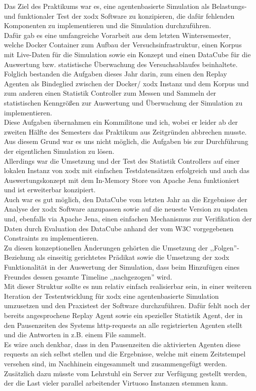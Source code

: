 \documentclass{article}
\begin{document}
Das Ziel des Praktikums war es, eine agentenbasierte Simulation als Belastungs- und funktionaler Test der xodx Software zu konzipieren, die dafür fehlenden Komponenten zu implementieren und die Simulation durchzuführen.\\
Dafür gab es eine umfangreiche Vorarbeit aus dem letzten Wintersemester, welche Docker Container zum Aufbau der Versuchsinfrastruktur, einen Korpus mit Live-Daten für die Simulation sowie ein Konzept und einen DataCube für die Auswertung bzw. statistische Überwachung des Versuchsablaufes beinhaltete.\\
Folglich bestanden die Aufgaben dieses Jahr darin, zum einen den Replay Agenten als Bindeglied zwischen der Docker/ xodx Instanz und dem Korpus und zum anderen einen Statistik Controller zum Messen und Sammeln der statistischen Kenngrößen zur Auswertung und Überwachung der Simulation zu implementieren.\\
Diese Aufgaben übernahmen ein Kommilitone und ich, wobei er leider ab der zweiten Hälfte des Semesters das Praktikum aus Zeitgründen abbrechen musste. Aus diesem Grund war es uns nicht möglich, die Aufgaben bis zur Durchführung der eigentlichen Simulation zu lösen.\\
Allerdings war die Umsetzung und der Test des Statistik Controllers auf einer lokalen Instanz von xodx mit einfachen Testdatensätzen erfolgreich und auch das Auswertungskonzept mit dem In-Memory Store von Apache Jena funktioniert und ist erweiterbar konzipiert.\\
Auch war es gut möglich, den DataCube vom letzten Jahr an die Ergebnisse der Analyse der xodx Software anzupassen sowie auf die neueste Version zu updaten und, ebenfalls via Apache Jena, einen einfachen Mechanismus zur Verifikation der Daten durch Evaluation des DataCube anhand der vom W3C vorgegebenen Constraints zu implementieren. \\
Zu diesen konzeptionellen Änderungen gehörten die Umsetzung der ,,Folgen''-Beziehung als einseitig gerichtetes Prädikat sowie die Umsetzung der xodx Funktionalität in der Auswertung der Simulation, dass beim Hinzufügen eines Freundes dessen gesamte Timeline ,,nachgezogen'' wird.\\
Mit dieser Struktur sollte es nun relativ einfach realisierbar sein, in einer weiteren Iteration der Testentwicklung für xodx eine agentenbasierte Simulation umzusetzen und den Praxistest der Software durchzuführen. Dafür fehlt noch der bereits angesprochene Replay Agent sowie ein spezieller Statistik Agent, der in den Pausenzeiten des Systems http-requests an alle registrierten Agenten stellt und die Antworten in z.B. einem File sammelt.\\
Es wäre auch denkbar, dass in den Pausenzeiten die aktivierten Agenten diese requests an sich selbst stellen und die Ergebnisse, welche mit einem Zeitstempel versehen sind, im Nachhinein eingesammelt und zusammengefügt werden.\\ 
Zusätzlich dazu müsste vom Lehrstuhl ein Server zur Verfügung gestellt werden, der die Last vieler parallel arbeitender Virtuoso Instanzen stemmen kann.

\newpage


\end{document}
